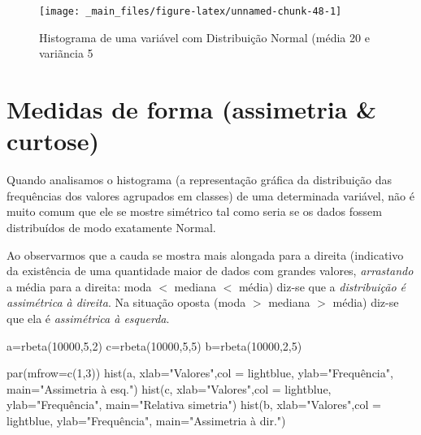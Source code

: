 \documentclass[
]{book}
\newenvironment{Shaded}{\begin{snugshade}}{\end{snugshade}}
\newcommand{\AttributeTok}[1]{\textcolor[rgb]{0.77,0.63,0.00}{#1}}
\newcommand{\DecValTok}[1]{\textcolor[rgb]{0.00,0.00,0.81}{#1}}
\newcommand{\FunctionTok}[1]{\textcolor[rgb]{0.00,0.00,0.00}{#1}}
\newcommand{\NormalTok}[1]{#1}
\newcommand{\OtherTok}[1]{\textcolor[rgb]{0.56,0.35,0.01}{#1}}
\newcommand{\StringTok}[1]{\textcolor[rgb]{0.31,0.60,0.02}{#1}}
\begin{document}
\begin{figure}

{\centering \texttt{[image: \_main\_files/figure-latex/unnamed-chunk-48-1]} 

}

\caption{Histograma de uma variável com Distribuição Normal (média 20 e variãncia 5}\label{fig:unnamed-chunk-48}
\end{figure}

\hypertarget{medidas-de-forma-assimetria-curtose}{%
\section{Medidas de forma (assimetria \& curtose)}\label{medidas-de-forma-assimetria-curtose}}

Quando analisamos o histograma (a representação gráfica da distribuição das frequências dos valores agrupados em classes) de uma determinada variável, não é muito comum que ele se mostre simétrico tal como seria se os dados fossem distribuídos de modo exatamente Normal.

Ao observarmos que a cauda se mostra mais alongada para a direita (indicativo da existência de uma quantidade maior de dados com grandes valores, \emph{arrastando} a média para a direita: moda \(<\) mediana \(<\) média) diz-se que a \emph{distribuição é assimétrica à direita}. Na situação oposta (moda \(>\) mediana \(>\) média) diz-se que ela é \emph{assimétrica à esquerda}.

\begin{Shaded}
\begin{Highlighting}[]
\NormalTok{a}\OtherTok{=}\FunctionTok{rbeta}\NormalTok{(}\DecValTok{10000}\NormalTok{,}\DecValTok{5}\NormalTok{,}\DecValTok{2}\NormalTok{)}
\NormalTok{c}\OtherTok{=}\FunctionTok{rbeta}\NormalTok{(}\DecValTok{10000}\NormalTok{,}\DecValTok{5}\NormalTok{,}\DecValTok{5}\NormalTok{)}
\NormalTok{b}\OtherTok{=}\FunctionTok{rbeta}\NormalTok{(}\DecValTok{10000}\NormalTok{,}\DecValTok{2}\NormalTok{,}\DecValTok{5}\NormalTok{)}

\FunctionTok{par}\NormalTok{(}\AttributeTok{mfrow=}\FunctionTok{c}\NormalTok{(}\DecValTok{1}\NormalTok{,}\DecValTok{3}\NormalTok{))}
\FunctionTok{hist}\NormalTok{(a, }
     \AttributeTok{xlab=}\StringTok{"Valores"}\NormalTok{,}\AttributeTok{col =} \StringTok{\textquotesingle{}lightblue\textquotesingle{}}\NormalTok{,}
     \AttributeTok{ylab=}\StringTok{"Frequência"}\NormalTok{,}
     \AttributeTok{main=}\StringTok{"Assimetria à esq."}\NormalTok{)}
\FunctionTok{hist}\NormalTok{(c, }
     \AttributeTok{xlab=}\StringTok{"Valores"}\NormalTok{,}\AttributeTok{col =} \StringTok{\textquotesingle{}lightblue\textquotesingle{}}\NormalTok{,}
     \AttributeTok{ylab=}\StringTok{"Frequência"}\NormalTok{,}
     \AttributeTok{main=}\StringTok{"Relativa simetria"}\NormalTok{)}
\FunctionTok{hist}\NormalTok{(b, }
     \AttributeTok{xlab=}\StringTok{"Valores"}\NormalTok{,}\AttributeTok{col =} \StringTok{\textquotesingle{}lightblue\textquotesingle{}}\NormalTok{,}
     \AttributeTok{ylab=}\StringTok{"Frequência"}\NormalTok{,}
     \AttributeTok{main=}\StringTok{"Assimetria à dir."}\NormalTok{)}
\end{Highlighting}
\end{Shaded}
\end{document}
